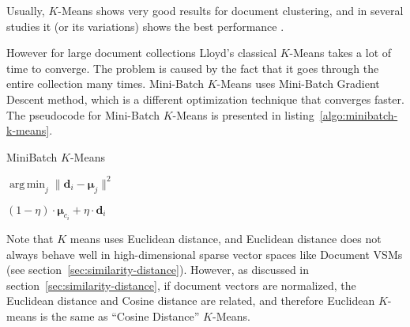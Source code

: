 Usually, $K$-Means shows very good results for document clustering, and in 
several studies it (or its variations) shows the best performance \cite{hall2012evaluating} \cite{steinbach2000comparison}. 

However for large document collections Lloyd's classical $K$-Means takes a lot 
of time to converge. The problem is caused by the fact that it goes through 
the entire collection many times. Mini-Batch $K$-Means \cite{sculley2010web} 
uses Mini-Batch Gradient Descent method, which is a different optimization technique
that converges faster. The pseudocode for Mini-Batch $K$-Means is presented 
in listing~\ref{algo:minibatch-k-means}.

\begin{algorithm}
\caption{MiniBatch $K$-Means}
\label{algo:minibatch-k-means}

\begin{algorithmic}[0]
  \Statex
     
    \EndFor


            {$\operatorname{arg\, min}_j \| \mathbf d_i - \boldsymbol \mu_j \|^2$}
      \EndFor

           
             
        {$(1 - \eta) \cdot \boldsymbol \mu_{c_i} + \eta \cdot \mathbf d_i$}
      \EndFor

    \State {}
  \EndFunction
\end{algorithmic}
\end{algorithm}


Note that $K$ means uses Euclidean distance, and Euclidean distance
does not always behave well in high-dimensional sparse vector spaces 
like Document VSMs (see section~\ref{sec:similarity-distance}). However, 
as discussed in section~\ref{sec:similarity-distance}, 
if document vectors are normalized, the Euclidean distance
and Cosine distance are related, and therefore 
Euclidean $K$-means is the same as ``Cosine Distance'' $K$-Means.


